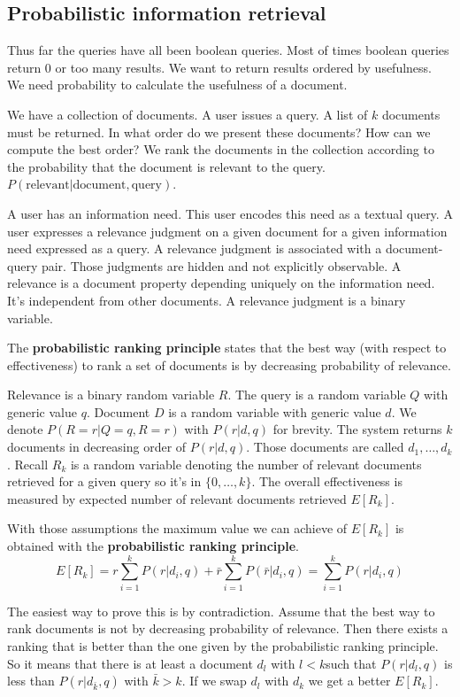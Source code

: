 \subsection{Probabilistic information retrieval}
\label{sec:probabilistic_information_retrieval}

Thus far the queries have all been boolean queries.
Most of times boolean queries return 0 or too many results.
We want to return results ordered by usefulness.
We need probability to calculate the usefulness of a document.

We have a collection of documents.
A user issues a query.
A list of $k$ documents must be returned.
In what order do we present these documents?
How can we compute the best order?
We rank the documents in the collection according to the probability
that the document is relevant to the query.
$P(\text{relevant}|\text{document},\text{query})$.

A user has an information need.
This user encodes this need as a textual query.
A user expresses a relevance judgment on a given document for a given
information need expressed as a query.
A relevance judgment is associated with a document-query pair.
Those judgments are hidden and not explicitly observable.
A relevance is a document property depending uniquely on the 
information need. It's independent from other documents.
A relevance judgment is a binary variable.

The \textbf{probabilistic ranking principle} states that the best way 
(with respect to effectiveness) to rank a set of documents
is by decreasing probability of relevance.

Relevance is a binary random variable $R$.
The query is a random variable $Q$ with generic value $q$.
Document $D$ is a random variable with generic value $d$.
We denote $P(R=r|Q=q,R=r)$ with $P(r|d,q)$ for brevity.
The system returns $k$ documents in decreasing order of $P(r|d,q)$.
Those documents are called $d_1,\dots,d_k$.
Recall $R_k$ is a random variable denoting the number of 
relevant documents retrieved for a given query so it's in $\{0,\dots,k\}$.
The overall effectiveness is measured by expected number
of relevant documents retrieved $E[R_k]$.

With those assumptions the maximum value we can achieve of $E[R_k]$
is obtained with the \textbf{probabilistic ranking principle}.
\[
    E[R_k] = r\sum_{i=1}^{k}P(r|d_i,q)+\bar{r}\sum_{i=1}^{k}P(\bar{r}|d_i,q) = 
    \sum_{i=1}^{k}P(r|d_i,q)
\]

The easiest way to prove this is by contradiction.
Assume that the best way to rank documents is not by decreasing
probability of relevance.
Then there exists a ranking that is better than the one given by
the probabilistic ranking principle.
So it means that there is at least a document $d_l$ with $l<k$such that
$P(r|d_l,q)$ is less than $P(r|d_{\bar k},q)$ with $\bar k>k$.
If we swap $d_l$ with $d_k$ we get a better $E[R_k]$.

